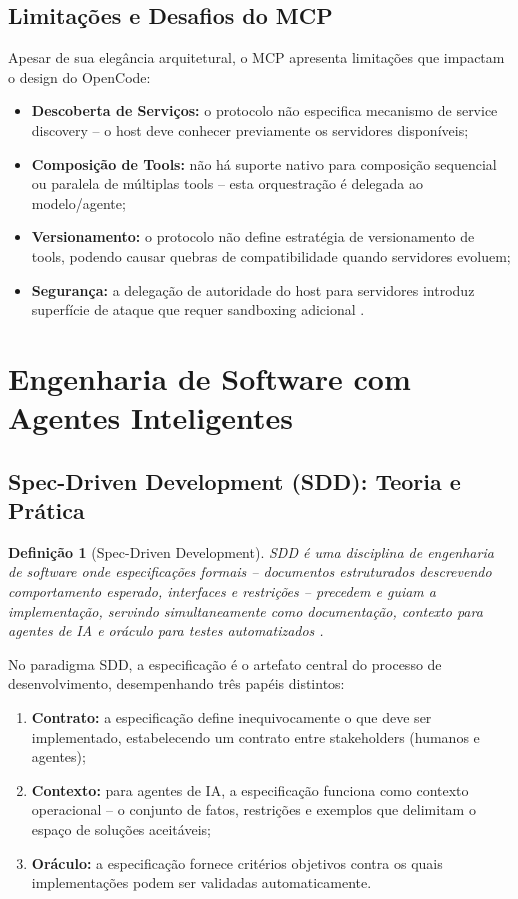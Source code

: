 \documentclass[12pt,a4paper,sumario=tradicional]{abntex2}
\newtheorem{definition}{Definição}[chapter]
\begin{document}
\subsection{Limitações e Desafios do MCP}

Apesar de sua elegância arquitetural, o MCP apresenta limitações que impactam o design do OpenCode:

\begin{itemize}
    \item \textbf{Descoberta de Serviços:} o protocolo não especifica mecanismo de service discovery -- o host deve conhecer previamente os servidores disponíveis;
    \item \textbf{Composição de Tools:} não há suporte nativo para composição sequencial ou paralela de múltiplas tools -- esta orquestração é delegada ao modelo/agente;
    \item \textbf{Versionamento:} o protocolo não define estratégia de versionamento de tools, podendo causar quebras de compatibilidade quando servidores evoluem;
    \item \textbf{Segurança:} a delegação de autoridade do host para servidores introduz superfície de ataque que requer sandboxing adicional \cite{ahn2025privacy}.
\end{itemize}

\section{Engenharia de Software com Agentes Inteligentes}

\subsection{Spec-Driven Development (SDD): Teoria e Prática}

\begin{definition}[Spec-Driven Development]
SDD é uma disciplina de engenharia de software onde especificações formais -- documentos estruturados descrevendo comportamento esperado, interfaces e restrições -- precedem e guiam a implementação, servindo simultaneamente como documentação, contexto para agentes de IA e oráculo para testes automatizados \cite{gomes2025sdscai}.
\end{definition}

No paradigma SDD, a especificação é o artefato central do processo de desenvolvimento, desempenhando três papéis distintos:

\begin{enumerate}[leftmargin=*]
    \item \textbf{Contrato:} a especificação define inequivocamente o que deve ser implementado, estabelecendo um contrato entre stakeholders (humanos e agentes);
    \item \textbf{Contexto:} para agentes de IA, a especificação funciona como contexto operacional -- o conjunto de fatos, restrições e exemplos que delimitam o espaço de soluções aceitáveis;
    \item \textbf{Oráculo:} a especificação fornece critérios objetivos contra os quais implementações podem ser validadas automaticamente.
\end{enumerate}
\end{document}
